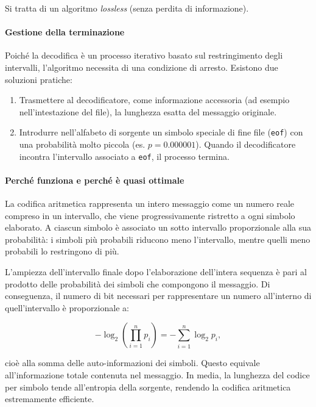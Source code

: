 \vspace{1em}

\noindent
Si tratta di un algoritmo \textit{lossless} (senza perdita di informazione).

\paragraph{Gestione della terminazione}
Poiché la decodifica è un processo iterativo basato sul restringimento degli intervalli, l'algoritmo necessita di una condizione di arresto. Esistono due soluzioni pratiche:
\begin{enumerate}
    \item Trasmettere al decodificatore, come informazione accessoria (ad esempio nell'intestazione del file), la lunghezza esatta del messaggio originale.
    \item Introdurre nell'alfabeto di sorgente un simbolo speciale di fine file (\texttt{eof}) con una probabilità molto piccola (es. $p = 0.000001$). Quando il decodificatore incontra l'intervallo associato a \texttt{eof}, il processo termina.
\end{enumerate}

\paragraph{Perché funziona e perché è quasi ottimale}

La codifica aritmetica rappresenta un intero messaggio come un numero reale compreso in un intervallo, che viene progressivamente ristretto a ogni simbolo elaborato. A ciascun simbolo è associato un sotto intervallo proporzionale alla sua probabilità: i simboli più probabili riducono meno l'intervallo, mentre quelli meno probabili lo restringono di più.

L'ampiezza dell'intervallo finale dopo l'elaborazione dell'intera sequenza è pari al prodotto delle probabilità dei simboli che compongono il messaggio. Di conseguenza, il numero di bit necessari per rappresentare un numero all'interno di quell'intervallo è proporzionale a:

\[
-\log_2 \left( \prod_{i=1}^n p_i \right) = -\sum_{i=1}^n \log_2 p_i,
\]

cioè alla somma delle auto-informazioni dei simboli. Questo equivale all'informazione totale contenuta nel messaggio. In media, la lunghezza del codice per simbolo tende all'entropia della sorgente, rendendo la codifica aritmetica estremamente efficiente.


